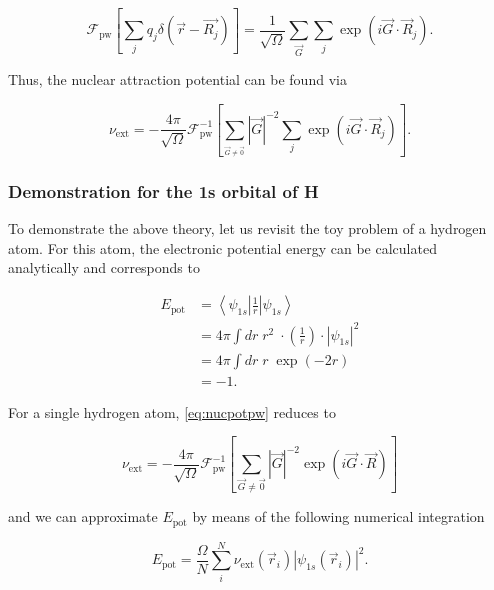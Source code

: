 \begin{equation}
    \mathcal{F}_{\text{pw}} \left[\sum_{j} q_{j} \delta(\vec{r} - \vec{R_{j}})\right] = \frac{1}{\sqrt{\Omega}} \sum_{\vec{G}} \sum_{j} \exp \left(i \vec{G} \cdot \vec{R}_{j} \right).
\end{equation}

Thus, the nuclear attraction potential can be found via

\begin{equation}
    \nu_{\text{ext}} = -\frac{4 \pi}{\sqrt{\Omega}} \mathcal{F}_{\text{pw}}^{-1} \left[\sum_{_{\vec{G} \neq \vec{0}}} |\vec{G}|^{-2} \sum_{j} \exp \left(i \vec{G} \cdot \vec{R}_{j} \right) \right].
    \label{eq:nucpotpw}
\end{equation}

%
%
%
\subsubsection{Demonstration for the 1s orbital of H}

To demonstrate the above theory, let us revisit the toy problem of a hydrogen atom. For this atom, the electronic potential energy can be calculated analytically and corresponds to

\begin{align}
    E_{\text{pot}} &= \left<\psi_{1s} \left| \frac{1}{r} \right| \psi_{1s}\right> \\
    &= 4 \pi \int dr \; r^{2} \; \cdot \left(\frac{1}{r}\right) \cdot |\psi_{1s}|^{2} \\
    &= 4 \pi \int dr \; r \; \exp \left(-2r \right) \\
    &= -1.
\end{align}

For a single hydrogen atom, \cref{eq:nucpotpw} reduces to

\begin{equation}
    \nu_{\text{ext}} = -\frac{4 \pi}{\sqrt{\Omega}} \mathcal{F}_{\text{pw}}^{-1} \left[ \sum_{\vec{G} \neq \vec{0}} |\vec{G}|^{-2} \exp \left(i \vec{G} \cdot \vec{R} \right) \right]
    \label{eq:nucpotpw}
\end{equation}

and we can approximate $E_{\text{pot}}$ by means of the following numerical integration

\begin{equation}
    E_{\text{pot}} = \frac{\Omega}{N} \sum_{i}^{N} \nu_{\text{ext}}(\vec{r}_{i}) |\psi_{1s}(\vec{r}_{i})|^{2}.
    \label{eq:nucpotpw}
\end{equation}

